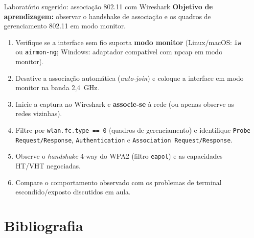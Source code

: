 \documentclass[aspectratio=169,11pt]{beamer}
\begin{document}
\begin{frame}{Laboratório sugerido: associação 802.11 com Wireshark}
  \textbf{Objetivo de aprendizagem:} observar o handshake de associação e os quadros de gerenciamento 802.11 em modo monitor.
  \begin{enumerate}
    \item Verifique se a interface sem fio suporta \textbf{modo monitor} (Linux/macOS: \texttt{iw} ou \texttt{airmon-ng}; Windows: adaptador compatível com npcap em modo monitor).
    \item Desative a associação automática (\emph{auto-join}) e coloque a interface em modo monitor na banda 2,4~GHz.
    \item Inicie a captura no Wireshark e \textbf{associe-se} à rede (ou apenas observe as redes vizinhas).
    \item Filtre por \texttt{wlan.fc.type == 0} (quadros de gerenciamento) e identifique \texttt{Probe Request/Response}, \texttt{Authentication} e \texttt{Association Request/Response}.
    \item Observe o \emph{handshake} 4-way do WPA2 (filtro \texttt{eapol}) e as capacidades HT/VHT negociadas.
    \item Compare o comportamento observado com os problemas de terminal escondido/exposto discutidos em aula.
  \end{enumerate}
\end{frame}

\section{Bibliografia}
\end{document}
